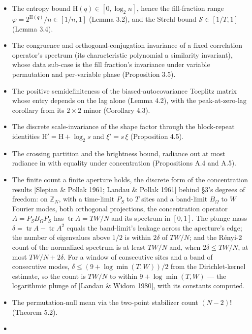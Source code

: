 \documentclass[10pt,letterpaper,twocolumn]{article}
\providecommand{\tightlist}{\setlength{\itemsep}{0pt}\setlength{\parskip}{0pt}}
\begin{document}
\begin{itemize}
\tightlist
\item
  The entropy bound \(\mathrm H(q)\in[0,\log_2 n]\), hence the fill-fraction range \(\varphi=2^{\mathrm H(q)}/n\in[1/n,1]\) (Lemma 3.2), and the Strehl bound \(\mathcal S\in[1/T,1]\) (Lemma 3.4).
\item
  The congruence and orthogonal-conjugation invariance of a fixed correlation operator's spectrum (its characteristic polynomial a similarity invariant), whose data sub-case is the fill fraction's invariance under variable permutation and per-variable phase (Proposition 3.5).
\item
  The positive semidefiniteness of the biased-autocovariance Toeplitz matrix whose entry depends on the lag alone (Lemma 4.2), with the peak-at-zero-lag corollary from its \(2\times2\) minor (Corollary 4.3).
\item
  The discrete scale-invariance of the shape factor through the block-repeat identities \(\mathrm H'=\mathrm H+\log_2 s\) and \(\xi'=s\,\xi\) (Proposition 4.5).
\item
  The crossing partition and the brightness bound, radiance out at most radiance in with equality under concentration (Propositions A.4 and A.5).
\item
  The finite count a finite aperture holds, the discrete form of the concentration results {[}Slepian \& Pollak 1961; Landau \& Pollak 1961{]} behind §3's degrees of freedom: on \(\mathbb Z_N\), with a time-limit \(P_S\) to \(T\) sites and a band-limit \(B_\Omega\) to \(W\) Fourier modes, both orthogonal projections, the concentration operator \(A=P_SB_\Omega P_S\) has \(\operatorname{tr}A=TW/N\) and its spectrum in \([0,1]\). The plunge mass \(\delta=\operatorname{tr}A-\operatorname{tr}A^2\) equals the band-limit's leakage across the aperture's edge; the number of eigenvalues above \(1/2\) is within \(2\delta\) of \(TW/N\); and the Rényi-2 count of the normalized spectrum is at least \(TW/N\) and, when \(2\delta\le TW/N\), at most \(TW/N+2\delta\). For a window of consecutive sites and a band of consecutive modes, \(\delta\le(9+\log\min(T,W))/2\) from the Dirichlet-kernel estimate, so the count is \(TW/N\) to within \(9+\log\min(T,W)\) --- the logarithmic plunge of {[}Landau \& Widom 1980{]}, with its constants computed.
\item
  The permutation-null mean via the two-point stabilizer count \((N-2)!\) (Theorem 5.2).
\item

\end{itemize}
\end{document}
